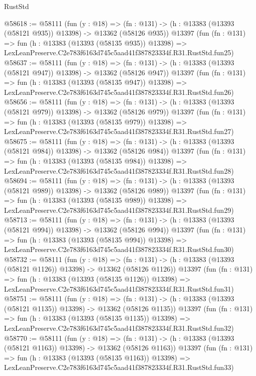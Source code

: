 \begin{lexlean}{RustStd}
\begin{coremodule}
@58618 := @58111
    (fun (y : @18) =>
    (fn : @131) -> (h : @13383 (@13393 (@58121 @935)) @13398) -> @13362 (@58126 @935))
    @13397
    (fun (fn : @131) =>
    fun (h : @13383 (@13393 (@58135 @935)) @13398) =>
    LexLeanPreserve.C2e783f6163d745c5aad41f387823334f.R31.RustStd.fun25)
@58637 := @58111
    (fun (y : @18) =>
    (fn : @131) -> (h : @13383 (@13393 (@58121 @947)) @13398) -> @13362 (@58126 @947))
    @13397
    (fun (fn : @131) =>
    fun (h : @13383 (@13393 (@58135 @947)) @13398) =>
    LexLeanPreserve.C2e783f6163d745c5aad41f387823334f.R31.RustStd.fun26)
@58656 := @58111
    (fun (y : @18) =>
    (fn : @131) -> (h : @13383 (@13393 (@58121 @979)) @13398) -> @13362 (@58126 @979))
    @13397
    (fun (fn : @131) =>
    fun (h : @13383 (@13393 (@58135 @979)) @13398) =>
    LexLeanPreserve.C2e783f6163d745c5aad41f387823334f.R31.RustStd.fun27)
@58675 := @58111
    (fun (y : @18) =>
    (fn : @131) -> (h : @13383 (@13393 (@58121 @984)) @13398) -> @13362 (@58126 @984))
    @13397
    (fun (fn : @131) =>
    fun (h : @13383 (@13393 (@58135 @984)) @13398) =>
    LexLeanPreserve.C2e783f6163d745c5aad41f387823334f.R31.RustStd.fun28)
@58694 := @58111
    (fun (y : @18) =>
    (fn : @131) -> (h : @13383 (@13393 (@58121 @989)) @13398) -> @13362 (@58126 @989))
    @13397
    (fun (fn : @131) =>
    fun (h : @13383 (@13393 (@58135 @989)) @13398) =>
    LexLeanPreserve.C2e783f6163d745c5aad41f387823334f.R31.RustStd.fun29)
@58713 := @58111
    (fun (y : @18) =>
    (fn : @131) -> (h : @13383 (@13393 (@58121 @994)) @13398) -> @13362 (@58126 @994))
    @13397
    (fun (fn : @131) =>
    fun (h : @13383 (@13393 (@58135 @994)) @13398) =>
    LexLeanPreserve.C2e783f6163d745c5aad41f387823334f.R31.RustStd.fun30)
@58732 := @58111
    (fun (y : @18) =>
    (fn : @131) -> (h : @13383 (@13393 (@58121 @1126)) @13398) -> @13362 (@58126 @1126))
    @13397
    (fun (fn : @131) =>
    fun (h : @13383 (@13393 (@58135 @1126)) @13398) =>
    LexLeanPreserve.C2e783f6163d745c5aad41f387823334f.R31.RustStd.fun31)
@58751 := @58111
    (fun (y : @18) =>
    (fn : @131) -> (h : @13383 (@13393 (@58121 @1135)) @13398) -> @13362 (@58126 @1135))
    @13397
    (fun (fn : @131) =>
    fun (h : @13383 (@13393 (@58135 @1135)) @13398) =>
    LexLeanPreserve.C2e783f6163d745c5aad41f387823334f.R31.RustStd.fun32)
@58770 := @58111
    (fun (y : @18) =>
    (fn : @131) -> (h : @13383 (@13393 (@58121 @1163)) @13398) -> @13362 (@58126 @1163))
    @13397
    (fun (fn : @131) =>
    fun (h : @13383 (@13393 (@58135 @1163)) @13398) =>
    LexLeanPreserve.C2e783f6163d745c5aad41f387823334f.R31.RustStd.fun33)

\end{coremodule}
\end{lexlean}
